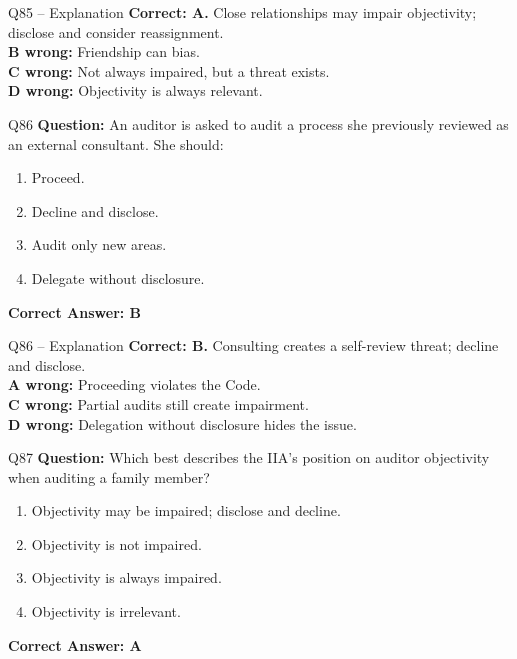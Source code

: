 \documentclass[aspectratio=169,10pt]{beamer}
\begin{document}
	\begin{frame}[t]{Q85 -- Explanation}
		\small
		\textbf{Correct: A.} Close relationships may impair objectivity; disclose and consider reassignment. \\[4pt]
		\textbf{B wrong:} Friendship can bias. \\[2pt]
		\textbf{C wrong:} Not always impaired, but a threat exists. \\[2pt]
		\textbf{D wrong:} Objectivity is always relevant.
	\end{frame}
	
	\begin{frame}[t]{Q86}
		\small
		\textbf{Question:} An auditor is asked to audit a process she previously reviewed as an external consultant. She should:
		\begin{enumerate}[label=\Alph*.,itemsep=1pt,topsep=2pt]
			\item Proceed.
			\item Decline and disclose.
			\item Audit only new areas.
			\item Delegate without disclosure.
		\end{enumerate}
		\vspace{4pt}
		\textbf{Correct Answer: B}
	\end{frame}
	
	\begin{frame}[t]{Q86 -- Explanation}
		\small
		\textbf{Correct: B.} Consulting creates a self-review threat; decline and disclose. \\[4pt]
		\textbf{A wrong:} Proceeding violates the Code. \\[2pt]
		\textbf{C wrong:} Partial audits still create impairment. \\[2pt]
		\textbf{D wrong:} Delegation without disclosure hides the issue.
	\end{frame}
	
	\begin{frame}[t]{Q87}
		\small
		\textbf{Question:} Which best describes the IIA's position on auditor objectivity when auditing a family member?
		\begin{enumerate}[label=\Alph*.,itemsep=1pt,topsep=2pt]
			\item Objectivity may be impaired; disclose and decline.
			\item Objectivity is not impaired.
			\item Objectivity is always impaired.
			\item Objectivity is irrelevant.
		\end{enumerate}
		\vspace{4pt}
		\textbf{Correct Answer: A}
	\end{frame}
	
\end{document}
